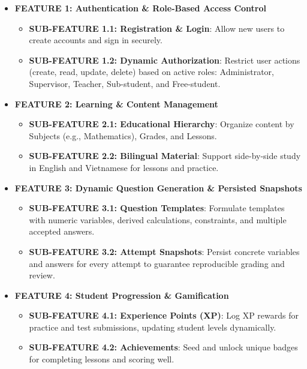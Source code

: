 \begin{itemize}
    \item \textbf{FEATURE 1: Authentication \& Role-Based Access Control}
    \begin{itemize}
        \item \textbf{SUB-FEATURE 1.1: Registration \& Login}: Allow new users to create accounts and sign in securely.
        \item \textbf{SUB-FEATURE 1.2: Dynamic Authorization}: Restrict user actions (create, read, update, delete) based on active roles: Administrator, Supervisor, Teacher, Sub-student, and Free-student.
    \end{itemize}

    \item \textbf{FEATURE 2: Learning \& Content Management}
    \begin{itemize}
        \item \textbf{SUB-FEATURE 2.1: Educational Hierarchy}: Organize content by Subjects (e.g., Mathematics), Grades, and Lessons.
        \item \textbf{SUB-FEATURE 2.2: Bilingual Material}: Support side-by-side study in English and Vietnamese for lessons and practice.
    \end{itemize}

    \item \textbf{FEATURE 3: Dynamic Question Generation \& Persisted Snapshots}
    \begin{itemize}
        \item \textbf{SUB-FEATURE 3.1: Question Templates}: Formulate templates with numeric variables, derived calculations, constraints, and multiple accepted answers.
        \item \textbf{SUB-FEATURE 3.2: Attempt Snapshots}: Persist concrete variables and answers for every attempt to guarantee reproducible grading and review.
    \end{itemize}

    \item \textbf{FEATURE 4: Student Progression \& Gamification}
    \begin{itemize}
        \item \textbf{SUB-FEATURE 4.1: Experience Points (XP)}: Log XP rewards for practice and test submissions, updating student levels dynamically.
        \item \textbf{SUB-FEATURE 4.2: Achievements}: Seed and unlock unique badges for completing lessons and scoring well.
    \end{itemize}


\end{itemize}
